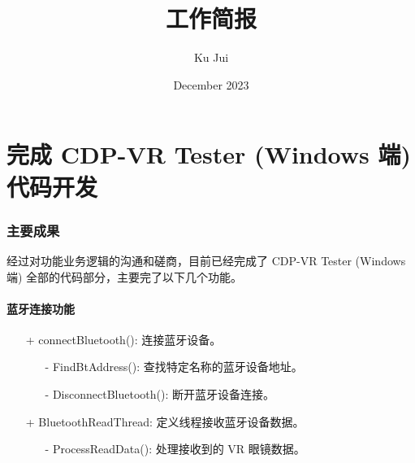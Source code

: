 \documentclass[a4paper, 10pt]{article}
\begin{document}
	
	
	\title{\songti {}工作简报}
	\author{\textrm{Ku Jui}}
	\date{\textrm{December 2023}}
	\maketitle
	
	\renewcommand{\figurename}{Figure} %
	\renewcommand{\contentsname}{目录}
	\renewcommand{\tablename}{Table}
	\newpage
	
	\part*{  完成 CDP-VR Tester (Windows 端) 代码开发}
	\section{主要成果}
	
	经过对功能业务逻辑的沟通和磋商，目前已经完成了 CDP-VR Tester (Windows 端) 全部的代码部分，主要完了以下几个功能。
	
	\subsection{蓝牙连接功能}
	
	\begin{itemize}
		\item [+] connectBluetooth(): 连接蓝牙设备。	
			\begin{itemize}
				\item [-] FindBtAddress(): 查找特定名称的蓝牙设备地址。
				\item [-] DisconnectBluetooth(): 断开蓝牙设备连接。
			\end{itemize}
		\item [+] BluetoothReadThread: 定义线程接收蓝牙设备数据。
			\begin{itemize}
				\item [-] ProcessReadData(): 处理接收到的 VR 眼镜数据。
			\end{itemize}
	\end{itemize}
	
\end{document}
